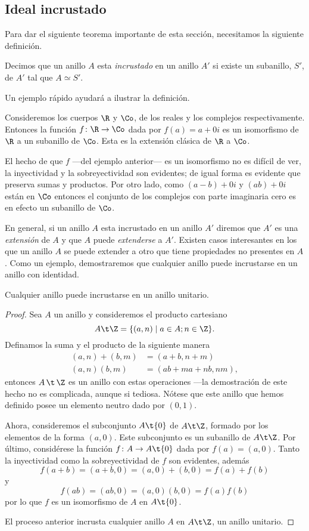 \subsection{Ideal incrustado}
Para dar el siguiente teorema importante de esta sección, necesitamos la siguiente definición.
\begin{defi}
	Decimos que un anillo $A$ esta \textit{incrustado} en un anillo $A'$ si existe un subanillo, $S'$, de $A'$ tal que $A\simeq S'$.
\end{defi}
Un ejemplo rápido ayudará a ilustrar la definición.
\begin{ejem} 
	Consideremos los cuerpos $\R$ y $\Co$, de los reales y los complejos respectivamente. Entonces la función $f\colon \R\to\Co$ dada por $f(a) = a+0i$ es un isomorfismo de $\R$ a un subanillo de $\Co$. Esta es la extensión clásica de $\R$ a $\Co$.
\end{ejem}
\begin{nota}
	El hecho de que $f$ ---del ejemplo anterior--- es un isomorfismo no es difícil de ver, la inyectividad y la sobreyectividad son evidentes; de igual forma es evidente que preserva sumas y productos. Por otro lado, como $(a-b)+0i$ y $(ab)+0i$ están en $\Co$ entonces el conjunto de los complejos con parte imaginaria cero es en efecto un subanillo de $\Co$.
\end{nota}
En general, si un anillo $A$ esta incrustado en un anillo $A'$ diremos que $A'$ es una \textit{extensión} de $A$ y que $A$ puede \textit{extenderse} a $A'$. Existen casos interesantes en los que un anillo $A$ se puede extender a otro que tiene propiedades no presentes en $A$. Como un ejemplo, demostraremos que cualquier anillo puede incrustarse en un anillo con identidad.
\begin{teo}
	Cualquier anillo puede incrustarse en un anillo unitario.
\end{teo}
\begin{proof}
	Sea $A$ un anillo y consideremos el producto cartesiano
	\[ A\t\Z = \{ (a,n) \mid a\in A; n\in\Z \}. \]
	Definamos la suma y el producto de la siguiente manera
	\begin{align*}
	(a,n) + (b,m) &= (a+b,n+m)  \\
	(a,n)(b,m)    &= (ab+ma+nb, nm),
	\end{align*}
	entonces $A\,\t\,\Z$ es un anillo con estas operaciones ---la demostración de este hecho no es complicada, aunque si tediosa. Nótese que este anillo que hemos definido posee un elemento neutro dado por $(0,1)$.
	
	Ahora, consideremos el subconjunto $A\t\{0\}$ de $A\t\Z$, formado por los elementos de la forma $(a,0)$. Este subconjunto es un subanillo de $A\t\Z$. Por último, considérese la función $f\colon  A\to A\t\{0\}$ dada por $f(a) = (a,0)$. Tanto la inyectividad como la sobreyectividad de $f$ son evidentes, además
	\[ f(a+b) = (a+b,0) = (a,0) + (b,0) = f(a) + f(b)\]
	y
	\[ f(ab) = (ab,0) = (a,0)(b,0) = f(a)f(b) \]
	por lo que $f$ es un isomorfismo de $A$ en $A\t\{0\}$. 
	
	El proceso anterior incrusta cualquier anillo $A$ en $A\t\Z$, un anillo unitario.
\end{proof}
